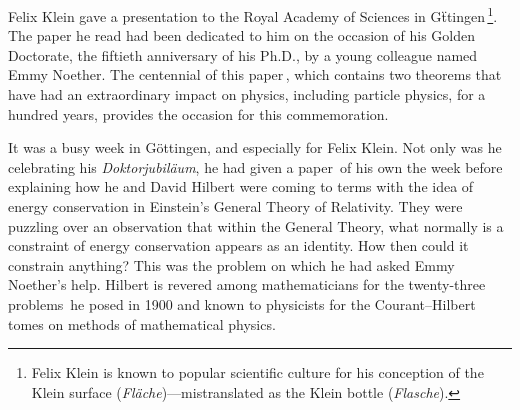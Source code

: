 \documentclass[twoside,symmetric]{tufte-handout}
\begin{document}

 Felix Klein gave a presentation to the Royal Academy of Sciences in G\"ttingen$\,$\footnote{Felix Klein is known to popular scientific culture for his conception of the Klein surface (\emph{Fläche})---mistranslated as the Klein bottle (\emph{Flasche}).}. The paper he read had been dedicated to him on the occasion of his Golden Doctorate, the fiftieth anniversary of his Ph.D., by a young colleague named Emmy Noether. The centennial of this paper$\,$\cite{Noether:1918zz,Noether2011}, which contains two theorems that have had an extraordinary impact on physics, including particle physics, for a hundred years, provides the occasion for this commemoration.

It was a busy week in G\"ottingen, and especially for Felix Klein. Not only was he celebrating his \emph{Doktorjubil\"aum}, he had given a paper$\,$\cite{Klein1918} of his own the week before explaining how he and David Hilbert were coming to terms with the idea of energy conservation in Einstein's General Theory of Relativity. They were puzzling over an observation that within the General Theory, what normally is a constraint of energy conservation appears as an identity. How then could it constrain anything? This was the problem on which he had asked Emmy Noether's help. Hilbert is revered among mathematicians for the twenty-three problems$\,$\cite{HilbertProbs} he posed in 1900 and known to physicists for the Courant--Hilbert tomes on methods of mathematical physics.
\end{document}

